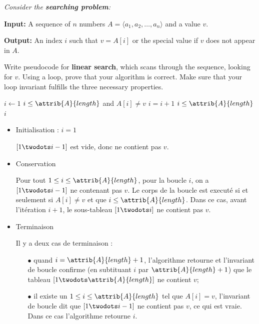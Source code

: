 \begin{description}
 {\itshape Consider the {\bfseries searching problem}:

  {\bfseries Input:} A sequence of $n$ numbers $A = \langle a_1, a_2, \ldots, a_n \rangle$ and a value $v$.

  {\bfseries Output:} An index $i$ such that $v = A[i]$ or the special value  if $v$ does not appear in $A$.

Write pseudocode for {\bfseries linear search}, which scans through the sequence, looking for $v$. Using a loop, prove that your algorithm is correct. Make sure that your loop invariant fulfills the three necessary properties.}
  \begin{ex}
  \begin{codebox}
    \li $i\gets1$
    \li \While $i \le \attrib{A}{length}$ and $A[i]\ne v$
    \li \Do $i = i+1$ \End
    \li \If $i \le \attrib{A}{length}$ 
    \li \Then \Return $i$
    \li \Else
    \li \Return {}
    \End
    \end{codebox}
\begin{itemize}
  \item Initialisation : $i = 1$

    $[1 \twodots i-1]$ est vide, donc ne contient pas $v$.
  \item Conservation

    Pour tout $1\le i\le \attrib{A}{length}$, pour la boucle $i$, on a $[1 \twodots i-1]$ ne contenant pas $v$. Le corps de la boucle est execut\'e si et seulement si $A[i] \ne v$ et que $i \le \attrib{A}{length}$. Dans ce cas, avant l'it\'eration $i+1$, le sous-tableau $[1 \twodots i]$ ne contient pas $v$.
  \item Terminaison

    Il y a deux cas de terminaison :
    \begin{itemize}
      \item[$\bullet$]  quand $i = \attrib{A}{length}+ 1$, l'algorithme retourne  et l'invariant de boucle confirme (en subtituant $i$ par $\attrib{A}{length}+1$) que le tableau $[1 \twodots \attrib{A}{length}]$ ne contient $v$;
      \item[$\bullet$] il existe un $1 \le i \le \attrib{A}{length}$ tel que $A[i] = v$, l'invariant de boucle dit que $[ 1 \twodots i-1]$ ne contient pas $v$, ce qui est vraie. Dans ce cas l'algorithme retourne $i$.
    \end{itemize}
\end{itemize}


\end{ex}
\end{description}

